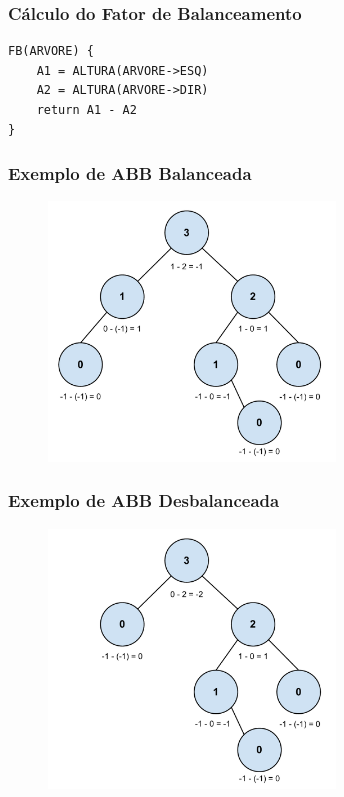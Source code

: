 \begin{frame}[fragile]
\frametitle{Cálculo do Fator de Balanceamento}
\begin{verbatim}
FB(ARVORE) {
    A1 = ALTURA(ARVORE->ESQ)
    A2 = ALTURA(ARVORE->DIR)
    return A1 - A2 
}
\end{verbatim}
\end{frame}


\begin{frame}
    \frametitle{Exemplo de ABB Balanceada}
    
    \begin{figure}[tbp]
    \includegraphics[keepaspectratio=true,width=3in]{figs/fig_arvores/Balanceamento_Arvore}
    \centering
    \end{figure}
\end{frame}

\begin{frame}
    \frametitle{Exemplo de ABB Desbalanceada}
    
    \begin{figure}[tbp]
    \includegraphics[keepaspectratio=true,width=3in]{figs/fig_arvores/Arvore_Desbalanceada}
    \centering
    \end{figure}
\end{frame}

